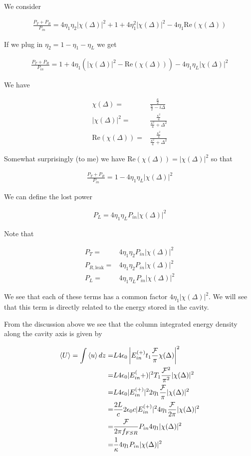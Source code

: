 \documentclass[12pt]{article}
\newcommand{\ep}{\epsilon}
\begin{document}
We consider

\begin{align}
\frac{P_T+P_R}{P_{in}} = 4\eta_1\eta_2|\chi(\Delta)|^2 + 1 + 4\eta_1^2|\chi(\Delta)|^2 - 4\eta_1\text{Re}(\chi(\Delta))
\end{align}

If we plug in $\eta_2 = 1-\eta_1 - \eta_L$ we get

\begin{align}
\frac{P_T+P_R}{P_{in}} = 1 + 4\eta_1(|\chi(\Delta)|^2 - \text{Re}(\chi(\Delta))) - 4\eta_1\eta_L |\chi(\Delta)|^2
\end{align}

We have

\begin{align}
\chi(\Delta) =& \frac{\frac{\kappa}{2}}{\frac{\kappa}{2}-i\Delta}\\
|\chi(\Delta)|^2 =& \frac{\frac{\kappa^2}{4}}{\frac{\kappa^2}{4} + \Delta^2}\\
\text{Re}(\chi(\Delta)) =& \frac{\frac{\kappa^2}{4}}{\frac{\kappa^2}{4} + \Delta^2}
\end{align}

Somewhat surprisingly (to me) we have $\text{Re}(\chi(\Delta)) = |\chi(\Delta)|^2$ so that

\begin{align}
\frac{P_T+P_R}{P_{in}} = 1 - 4\eta_1\eta_L |\chi(\Delta)|^2
\end{align}

We can define the lost power

\begin{align}
P_L = 4\eta_1\eta_L P_{in} |\chi(\Delta)|^2
\end{align}

Note that

\begin{align}
P_T =& 4\eta_1\eta_2P_{in}|\chi(\Delta)|^2\\
P_{R,\text{leak}} =& 4\eta_1\eta_2P_{in}|\chi(\Delta)|^2\\
P_L =& 4\eta_1 \eta_L P_{in}|\chi(\Delta)|^2
\end{align}

We see that each of these terms has a common factor $4\eta_1|\chi(\Delta)|^2$. 
We will see that this term is directly related to the energy stored in the cavity.

From the discussion above we see that the column integrated energy density along the cavity axis is given by

\begin{align}
\Braket{U} = \int \Braket{u} dz =& L 4 \ep_0\left|E^{(+)}_{in}t_1\frac{\mathcal{F}}{\pi}\chi(\Delta)\right|^2\\
=& L4 \ep_0 |E_{in}^(+)|^2 T_1\frac{\mathcal{F}^2}{\pi^2}|\chi(\Delta)|^2\\
=& L4 \ep_0 |E_{in}^{(+)}|^2 2\eta_1 \frac{\mathcal{F}}{\pi}|\chi(\Delta)|^2\\
=& \frac{2L}{c} 2\ep_0 c |E_{in}^{(+)}|^2 4\eta_1 \frac{\mathcal{F}}{2\pi} |\chi(\Delta)|^2\\
=& \frac{\mathcal{F}}{2\pi f_{FSR}} P_{in} 4\eta_1 |\chi(\Delta)|^2\\
=& \frac{1}{\kappa} 4\eta_1 P_{in} |\chi(\Delta)|^2
\end{align}
\end{document}

